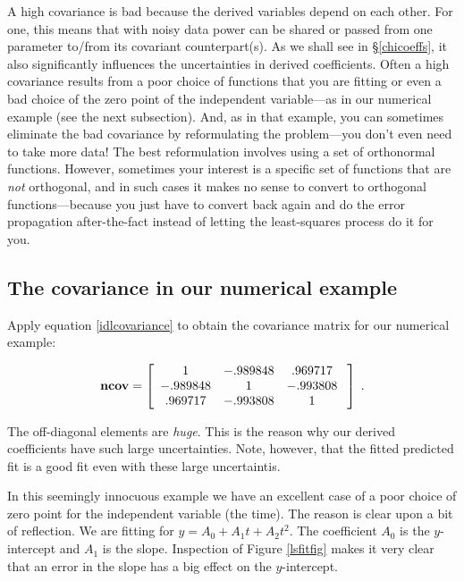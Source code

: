 \documentclass[psfig,preprint]{aastex}
\begin{document}
	A high covariance is bad because the derived variables depend on
each other.  For one, this means that with noisy data power can be
shared or passed from one parameter to/from its covariant
counterpart(s). As we shall see in \S \ref{chicoeffs}, it also
significantly  influences the uncertainties in derived coefficients.
Often a high covariance results from a poor choice of functions that you
are fitting or even a bad choice of the zero point of the independent
variable---as in our numerical example (see the next subsection).  And,
as in that example, you can sometimes eliminate the bad covariance by
reformulating the problem---you don't even need to take more data! The
best reformulation involves using a set of orthonormal functions.
However, sometimes your interest is a specific set of functions that are
{\it not} orthogonal, and in such cases it makes no sense to convert to
orthogonal functions---because you just have to convert back again and
do the error propagation after-the-fact instead of letting the
least-squares process do it for you.

\subsection{ The covariance in our numerical example} \label{covarianceone}

	Apply equation \ref{idlcovariance} to obtain the covariance
matrix for our numerical example:

\begin{eqnarray}
{\bf ncov} = \left[
\begin{array}{ccc}
1  &  -.989848   &  .969717  \\
-.989848  &  1   &  -.993808  \\
.969717  & -.993808 &  1  \\
\end{array} \; \right] \; .
\end{eqnarray}

	The off-diagonal elements are {\it huge}.  This is the reason
why our derived coefficients have such large uncertainties.  Note,
however, that the fitted predicted fit is a good fit even with these
large uncertaintis. 

	In this seemingly innocuous example we have an excellent case of
a poor choice of zero point for the independent variable (the time). 
The reason is clear upon a bit of reflection. We are fitting for $y =
A_0 + A_1 t + A_2 t^2$. The coefficient $A_0$ is the $y$-intercept and
$A_1$ is the slope. Inspection of Figure \ref{lsfitfig} makes it very
clear that an error in the slope has a big effect on the $y$-intercept. 
\end{document}
